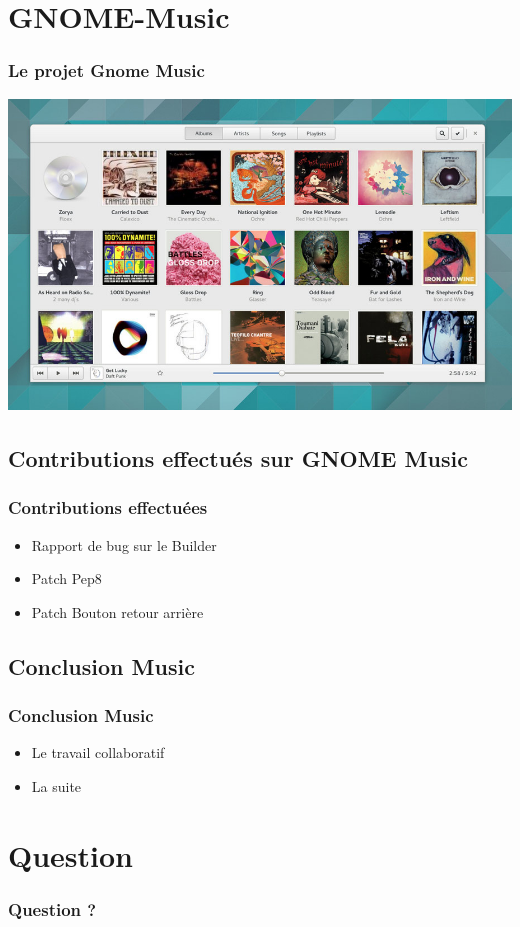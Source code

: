 \documentclass{beamer}
\begin{document}
\section{GNOME-Music}
\begin{frame}
  \frametitle{Le projet Gnome Music}
  \includegraphics[scale=0.325]{images/gnome-music-app.png}
\end{frame}

\subsection{Contributions effectués sur GNOME Music}
\begin{frame}
  \frametitle{Contributions effectuées}
  \begin{itemize}
  \item Rapport de bug sur le Builder
  \item Patch Pep8
  \item Patch Bouton retour arrière
  \end{itemize}
\end{frame}

\subsection{Conclusion Music}
\begin{frame}
  \frametitle{Conclusion Music}
  \begin{itemize}
  \item Le travail collaboratif
  \item La suite
  \end{itemize}
\end{frame}

\section{Question}
\begin{frame}
  \frametitle{Question ?}
\end{frame}
\end{document}
